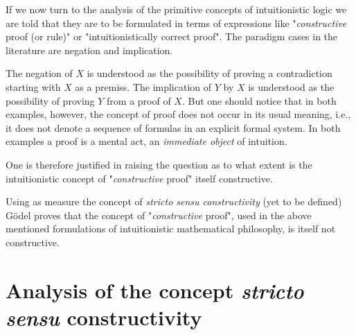 \documentclass[12pt]{article}
\begin{document}
If we now turn to the analysis of the primitive concepts of intuitionistic logic we are told that they are to be formulated in terms of expressions like "\emph{constructive} proof (or rule)" or "intuitionistically correct proof". The paradigm cases in the literature are negation and implication.

The negation of $X$ is understood as the possibility of proving a contradiction starting with $X$ as a premiss. The implication of $Y$ by $X$ is understood as the possibility of proving $Y$ from a proof of $X$. But one should notice that in both examples, however, the concept of proof does not occur in its usual meaning, i.e., it does not denote a sequence of formulas in an explicit formal system. In both examples a proof is a mental act, an \emph{immediate object} of intuition.

One is therefore justified in raising the question as to what extent is the intuitionistic concept of "\emph{constructive} proof" itself constructive.

Using as measure the concept of \emph{stricto sensu constructivity} (yet to be defined) G\"{o}del proves that the concept of "\emph{constructive} proof", used in the above mentioned formulations of intuitionistic mathematical philosophy, is itself not constructive. 

\section{Analysis of the concept \emph{stricto sensu} constructivity}\normalsize
\end{document}
